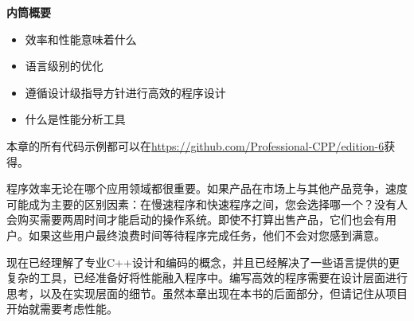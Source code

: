 \noindent
\textbf{内筒概要}

\begin{itemize}
\item
效率和性能意味着什么

\item
语言级别的优化

\item
遵循设计级指导方针进行高效的程序设计

\item
什么是性能分析工具
\end{itemize}

本章的所有代码示例都可以在\url{https://github.com/Professional-CPP/edition-6}获得。

程序效率无论在哪个应用领域都很重要。如果产品在市场上与其他产品竞争，速度可能成为主要的区别因素：在慢速程序和快速程序之间，您会选择哪一个？没有人会购买需要两周时间才能启动的操作系统。即使不打算出售产品，它们也会有用户。如果这些用户最终浪费时间等待程序完成任务，他们不会对您感到满意。

现在已经理解了专业C++设计和编码的概念，并且已经解决了一些语言提供的更复杂的工具，已经准备好将性能融入程序中。编写高效的程序需要在设计层面进行思考，以及在实现层面的细节。虽然本章出现在本书的后面部分，但请记住从项目开始就需要考虑性能。
















